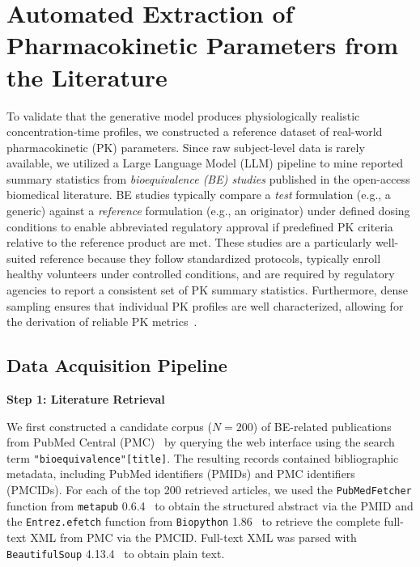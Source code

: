 
\section{Automated Extraction of Pharmacokinetic Parameters from the Literature}
\label{app:literature-extraction}

To validate that the generative model produces physiologically realistic concentration-time profiles, we constructed a reference dataset of real-world pharmacokinetic (PK) parameters.
%
Since raw subject-level data is rarely available, we utilized a Large Language Model (LLM) pipeline to mine reported summary statistics from \textit{bioequivalence (BE) studies} published in the open-access biomedical literature. 
%
BE studies typically compare a \emph{test} formulation (e.g., a generic) against a \emph{reference} formulation (e.g., an originator) under defined dosing conditions to enable abbreviated regulatory approval if predefined PK criteria relative to the reference product are met. 
%
These studies are a particularly well-suited reference because they follow standardized protocols, typically enroll healthy volunteers under controlled conditions, and are required by regulatory agencies to report a consistent set of PK summary statistics.
%
Furthermore, dense sampling ensures that individual PK profiles are well characterized, allowing for the derivation of reliable PK metrics~\citep{FDA2021Bioequivalence}.

\subsection{Data Acquisition Pipeline}

\textbf{Step 1: Literature Retrieval}

We first constructed a candidate corpus ($N=200$) of BE-related publications from PubMed Central (PMC)~\citep{pmc_database} by querying the web interface using the search term \texttt{"bioequivalence"[title]}.  
%
The resulting records contained bibliographic metadata, including PubMed identifiers (PMIDs) and PMC identifiers (PMCIDs).  
%
For each of the top 200 retrieved articles, we used the \texttt{PubMedFetcher} function from \texttt{metapub} 0.6.4~\citep{most_metapub} to obtain the structured abstract via the PMID and the \texttt{Entrez.efetch} function from \texttt{Biopython} 1.86~\citep{biopython} to retrieve the complete full-text XML from PMC via the PMCID.
%
Full-text XML was parsed with \texttt{BeautifulSoup} 4.13.4~\citep{beautifulsoup4_2025} to obtain plain text.


